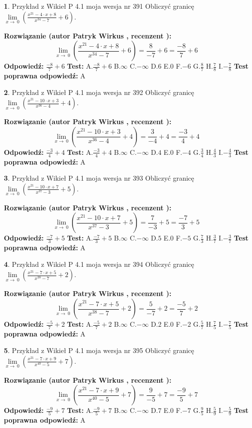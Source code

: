 \documentclass[12pt, a4paper]{article}
\theoremstyle{definition} %
\newtheorem{zad}{}
\newcommand{\zadStart}[1]{\begin{zad}#1\newline}
\newcommand{\zadStop}{\end{zad}}
\newcommand{\rozwStart}[2]{\noindent \textbf{Rozwiązanie (autor #1 , recenzent #2): }\newline}
\newcommand{\rozwStop}{\newline}
\newcommand{\odpStart}{\noindent \textbf{Odpowiedź:}\newline}
\newcommand{\odpStop}{\newline}
\newcommand{\testStart}{\noindent \textbf{Test:}\newline}
\newcommand{\testStop}{\newline}
\newcommand{\kluczStart}{\noindent \textbf{Test poprawna odpowiedź:}\newline}
\newcommand{\kluczStop}{\newline}
\begin{document}
\zadStart{Przykład z Wikieł P 4.1 moja wersja nr 391}
Obliczyć granicę $\lim\limits_{x\to\ 0}(\frac{x^{21}-4 \cdot x +8}{x^{34}-7}+6)$.
\zadStop
\rozwStart{Patryk Wirkus}{}
$$\lim\limits_{x\to\ 0}(\frac{x^{21}-4 \cdot x +8}{x^{34}-7}+6)=\frac{8}{-7}+6=\frac{-8}{7}+6$$
\rozwStop
\odpStart
$\frac{-8}{7}+6$
\odpStop
\testStart
A.$\frac{-8}{7}+6$
B.$\infty$
C.$-\infty$
D.$6$
E.$0$
F.$-6$
G.$\frac{8}{7}$
H.$\frac{7}{8}$
I.$-\frac{7}{8}$
\testStop
\kluczStart
A
\kluczStop



\zadStart{Przykład z Wikieł P 4.1 moja wersja nr 392}
Obliczyć granicę $\lim\limits_{x\to\ 0}(\frac{x^{21}-10 \cdot x +3}{x^{36}-4}+4)$.
\zadStop
\rozwStart{Patryk Wirkus}{}
$$\lim\limits_{x\to\ 0}(\frac{x^{21}-10 \cdot x +3}{x^{36}-4}+4)=\frac{3}{-4}+4=\frac{-3}{4}+4$$
\rozwStop
\odpStart
$\frac{-3}{4}+4$
\odpStop
\testStart
A.$\frac{-3}{4}+4$
B.$\infty$
C.$-\infty$
D.$4$
E.$0$
F.$-4$
G.$\frac{3}{4}$
H.$\frac{4}{3}$
I.$-\frac{4}{3}$
\testStop
\kluczStart
A
\kluczStop



\zadStart{Przykład z Wikieł P 4.1 moja wersja nr 393}
Obliczyć granicę $\lim\limits_{x\to\ 0}(\frac{x^{21}-10 \cdot x +7}{x^{37}-3}+5)$.
\zadStop
\rozwStart{Patryk Wirkus}{}
$$\lim\limits_{x\to\ 0}(\frac{x^{21}-10 \cdot x +7}{x^{37}-3}+5)=\frac{7}{-3}+5=\frac{-7}{3}+5$$
\rozwStop
\odpStart
$\frac{-7}{3}+5$
\odpStop
\testStart
A.$\frac{-7}{3}+5$
B.$\infty$
C.$-\infty$
D.$5$
E.$0$
F.$-5$
G.$\frac{7}{3}$
H.$\frac{3}{7}$
I.$-\frac{3}{7}$
\testStop
\kluczStart
A
\kluczStop



\zadStart{Przykład z Wikieł P 4.1 moja wersja nr 394}
Obliczyć granicę $\lim\limits_{x\to\ 0}(\frac{x^{21}-7 \cdot x +5}{x^{38}-7}+2)$.
\zadStop
\rozwStart{Patryk Wirkus}{}
$$\lim\limits_{x\to\ 0}(\frac{x^{21}-7 \cdot x +5}{x^{38}-7}+2)=\frac{5}{-7}+2=\frac{-5}{7}+2$$
\rozwStop
\odpStart
$\frac{-5}{7}+2$
\odpStop
\testStart
A.$\frac{-5}{7}+2$
B.$\infty$
C.$-\infty$
D.$2$
E.$0$
F.$-2$
G.$\frac{5}{7}$
H.$\frac{7}{5}$
I.$-\frac{7}{5}$
\testStop
\kluczStart
A
\kluczStop



\zadStart{Przykład z Wikieł P 4.1 moja wersja nr 395}
Obliczyć granicę $\lim\limits_{x\to\ 0}(\frac{x^{21}-7 \cdot x +9}{x^{40}-5}+7)$.
\zadStop
\rozwStart{Patryk Wirkus}{}
$$\lim\limits_{x\to\ 0}(\frac{x^{21}-7 \cdot x +9}{x^{40}-5}+7)=\frac{9}{-5}+7=\frac{-9}{5}+7$$
\rozwStop
\odpStart
$\frac{-9}{5}+7$
\odpStop
\testStart
A.$\frac{-9}{5}+7$
B.$\infty$
C.$-\infty$
D.$7$
E.$0$
F.$-7$
G.$\frac{9}{5}$
H.$\frac{5}{9}$
I.$-\frac{5}{9}$
\testStop
\kluczStart
A
\kluczStop
\end{document}
